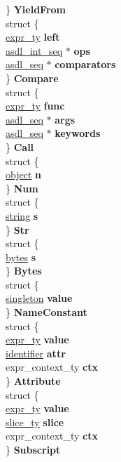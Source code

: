 \begin{DoxyCompactItemize}
\begin{tabbing}
\>\} {\bfseries YieldFrom}\\
\>struct \{\\
\>\>\hyperlink{struct__expr}{expr\_ty} {\bfseries left}\\
\>\>\hyperlink{structasdl__int__seq}{asdl\_int\_seq} $\ast$ {\bfseries ops}\\
\>\>\hyperlink{structasdl__seq}{asdl\_seq} $\ast$ {\bfseries comparators}\\
\>\} {\bfseries Compare}\\
\>struct \{\\
\>\>\hyperlink{struct__expr}{expr\_ty} {\bfseries func}\\
\>\>\hyperlink{structasdl__seq}{asdl\_seq} $\ast$ {\bfseries args}\\
\>\>\hyperlink{structasdl__seq}{asdl\_seq} $\ast$ {\bfseries keywords}\\
\>\} {\bfseries Call}\\
\>struct \{\\
\>\>\hyperlink{struct__object}{object} {\bfseries n}\\
\>\} {\bfseries Num}\\
\>struct \{\\
\>\>\hyperlink{struct__object}{string} {\bfseries s}\\
\>\} {\bfseries Str}\\
\>struct \{\\
\>\>\hyperlink{struct__object}{bytes} {\bfseries s}\\
\>\} {\bfseries Bytes}\\
\>struct \{\\
\>\>\hyperlink{struct__object}{singleton} {\bfseries value}\\
\>\} {\bfseries NameConstant}\\
\>struct \{\\
\>\>\hyperlink{struct__expr}{expr\_ty} {\bfseries value}\\
\>\>\hyperlink{struct__object}{identifier} {\bfseries attr}\\
\>\>expr\_context\_ty {\bfseries ctx}\\
\>\} {\bfseries Attribute}\\
\>struct \{\\
\>\>\hyperlink{struct__expr}{expr\_ty} {\bfseries value}\\
\>\>\hyperlink{struct__slice}{slice\_ty} {\bfseries slice}\\
\>\>expr\_context\_ty {\bfseries ctx}\\
\>\} {\bfseries Subscript}\\

\end{tabbing}
\end{DoxyCompactItemize}

